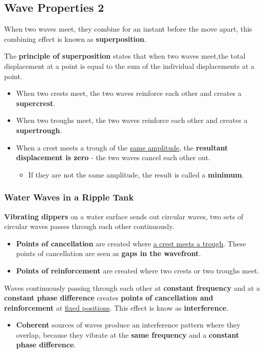 \subsection{Wave Properties 2}

When two waves meet, they combine for an instant before the move apart, this combining effect is known as \textbf{superposition}.

The \textbf{principle of superposition} states that when two waves meet,the total displacement at a point is equal to the sum of the individual displacements at a point.
\begin{itemize}
    \item When two crests meet, the two waves reinforce each other and creates a \textbf{supercrest}.
    \item When two troughs meet, the two waves reinforce each other and creates a \textbf{supertrough}.
    \item When a crest meets a trough of the \underline{same amplitude}, the \textbf{resultant displacement is zero} - the two waves cancel each other out.
        \begin{itemize}
            \item If they are not the same amplitude, the result is called a \textbf{minimum}.
        \end{itemize}
\end{itemize}

\subsubsection*{Water Waves in a Ripple Tank}

\textbf{Vibrating dippers} on a water surface sends out circular waves, two sets of circular waves passes through each other continuously.
\begin{itemize}
    \item \textbf{Points of cancellation} are created where \underline{a crest meets a trough}. These points of cancellation are seen as \textbf{gaps in the wavefront}.
    \item \textbf{Points of reinforcement} are created where two crests or two troughs meet.
\end{itemize}

Waves continuously passing through each other at \textbf{constant frequency} and at a \textbf{constant phase difference} creates \textbf{points of cancellation and reinforcement} at \underline{fixed positions}. This effect is know as \textbf{interference}.
\begin{itemize}
    \item \textbf{Coherent} sources of waves produce an interference pattern where they overlap, because they vibrate at the \textbf{same frequency} and a \textbf{constant phase difference}.
\end{itemize}

